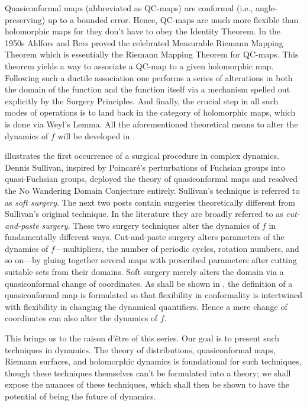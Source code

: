 \documentclass[11pt,a4paper]{article}
\begin{document}
        Quasiconformal maps (abbreviated as QC-maps) are conformal (i.e., angle-preserving) up to a bounded error. Hence, QC-maps are much more flexible than holomorphic maps for they don't have to obey the Identity Theorem. In the 1950s Ahlfors and Bers proved the celebrated Measurable Riemann Mapping Theorem which is essentially the Riemann Mapping Theorem for QC-maps. This theorem yields a way to associate a QC-map to a given holomorphic map. Following such a ductile association one performs a series of alterations in both the domain of the function and the function itself via a mechanism spelled out explicitly by the Surgery Principles. And finally, the crucial step in all such modes of operations is to land back in the category of holomorphic maps, which is done via Weyl's Lemma. All the aforementioned theoretical means to alter the dynamics of $f$ will be developed in .

         illustrates the first occurrence of a surgical procedure in complex dynamics. Dennis Sullivan, inspired by Poincar\'e's perturbations of Fuchsian groups into quasi-Fuchsian groups, deployed the theory of quasiconformal maps and resolved the No Wandering Domain Conjecture entirely. Sullivan's technique is referred to as \emph{soft surgery}. The next two posts contain surgeries theoretically different from Sullivan's original technique. In the literature they are broadly referred to as \emph{cut-and-paste surgery}. These two surgery techniques alter the dynamics of $f$ in fundamentally different ways. Cut-and-paste surgery alters parameters of the dynamics of $f$---multipliers, the number of periodic cycles, rotation numbers, and so on---by gluing together several maps with prescribed parameters after cutting suitable sets from their domains. Soft surgery merely alters the domain via a quasiconformal change of coordinates. As shall be shown in , the definition of a quasiconformal map is formulated so that flexibility in conformality is intertwined with flexibility in changing the dynamical quantifiers. Hence a mere change of coordinates can also alter the dynamics of $f$.

        This brings us to the raison d’\^etre of this series. Our goal is to present such techniques in dynamics. The theory of distributions, quasiconformal maps, Riemann surfaces, and holomorphic dynamics is foundational for such techniques, though these techniques themselves can't be formulated into a theory; we shall expose the nuances of these techniques, which shall then be shown to have the potential of being the future of dynamics.
\end{document}
